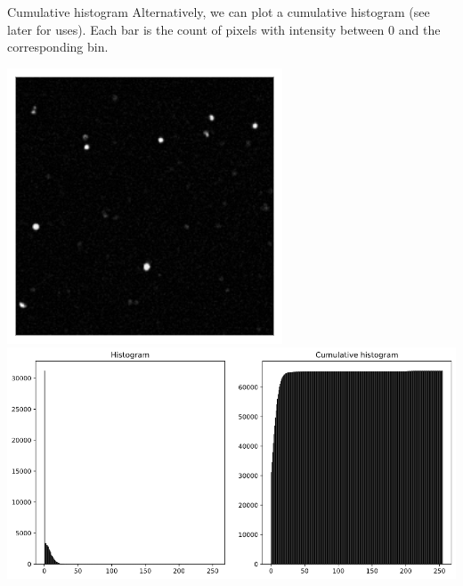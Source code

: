 \documentclass[9pt, aspectratio=169]{beamer}
\begin{document}
\begin{frame}
    {Cumulative histogram}
    Alternatively, we can plot a cumulative histogram (see later for uses). Each bar is the count of pixels with intensity between 0 and the corresponding bin.

    \includegraphics[height=.5\textheight]{pit_cells.png}
    \includegraphics[height=.5\textheight]{pit_cells_histo_cumul.png}
\end{frame}
\end{document}
